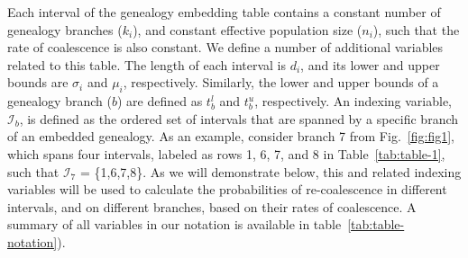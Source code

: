 \documentclass[11pt]{article}
\begin{document}
Each interval of the genealogy embedding table contains a constant number
of genealogy branches ($k_i$), and constant effective population size 
($n_i$), such that the rate of coalescence is also constant.
We define a number of additional variables related to this table. 
The length of each interval is $d_i$, and its lower and upper bounds 
are $\sigma_i$ and $\mu_i$, respectively. Similarly, the lower and upper 
bounds of a genealogy branch ($b$) are defined as $t_b^l$ and $t_b^u$, 
respectively. 
An indexing variable, $\mathcal{I}_b$, is defined as the
ordered set of intervals that are spanned by a specific branch
of an embedded genealogy. As an example, consider branch 7 from 
Fig.~\ref{fig:fig1}, which spans four intervals, 
labeled as rows 1, 6, 7, and 8 in Table~\ref{tab:table-1}, 
such that $\mathcal{I}_7$ = \{1,6,7,8\}. As we will
demonstrate below, this and related indexing variables will be
used to calculate the probabilities of re-coalescence in different
intervals, and on different branches, based on their rates of 
coalescence.
A summary of all variables in our notation is available in 
table~\ref{tab:table-notation}). 

\end{document}
